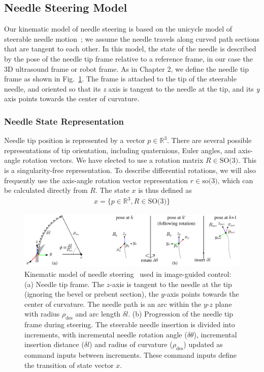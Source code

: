 \subsection{Needle Steering Model}
Our kinematic model of needle steering is based on the unicycle model of steerable needle motion~\cite{Webster2006,Park2005}; we assume the needle travels along curved path sections that are tangent to each other. In this model, the state of the needle is described by the pose of the needle tip frame relative to a reference frame, in our case the 3D ultrasound frame or robot frame. As in Chapter 2, we define the needle tip frame as shown in Fig.~\ref{fig:NeedleKinematics}. The frame is attached to the tip of the steerable needle, and oriented so that its \textit{z} axis is tangent to the needle at the tip, and its \textit{y} axis points towards the center of curvature. 

\subsubsection{Needle State Representation}
Needle tip position is represented by a vector ${p} \in \mathbb{R}^3$. There are several possible representations of tip orientation, including quaternions, Euler angles, and axis-angle rotation vectors. We have elected to use a rotation matrix ${R} \in \textrm{SO(3)}$. This is a singularity-free representation. To describe differential rotations, we will also frequently use the axis-angle rotation vector representation $r \in \textrm{so(3)}$, which can be calculated directly from ${R}$. The state ${x}$ is thus defined as
\begin{align}
{x} = \{p \in \mathbb{R}^3, R \in \textrm{SO(3)}\}
\end{align}

\begin{figure}[!t]
\centering
\includegraphics[width=\textwidth]{Images/Chapter4/NeedleKinematics/NeedleKinematics}%
\caption[Kinematic model of needle steering]{Kinematic model of needle steering~\cite{Webster2006} used in image-guided control: (a) Needle tip frame. The $z$-axis is tangent to the needle at the tip (ignoring the bevel or prebent section), the $y$-axis points towards the center of curvature. The needle path is an arc within the $y$-$z$ plane with radius $\rho_\text{des}$ and arc length $\delta l$. (b) Progression of the needle tip frame during steering. The steerable needle insertion is divided into increments, with incremental needle rotation angle ($\delta\theta$), incremental insertion distance ($\delta l$) and radius of curvature ($\rho_\text{des}$) updated as command inputs between increments. These command inputs define the transition of state vector ${x}$.}
\label{fig:NeedleKinematics}
\end{figure}

